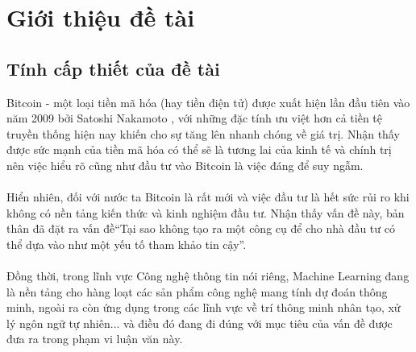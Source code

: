 \chapter{Giới thiệu đề tài}
\section{Tính cấp thiết của đề tài}
Bitcoin - một loại tiền mã hóa (hay tiền điện tử) được xuất hiện lần đầu tiên 
vào năm 2009 bởi Satoshi Nakamoto \cite{Bitcoin}, với những đặc tính ưu việt hơn cả tiền tệ 
truyền thống hiện nay khiến cho sự tăng lên nhanh chóng về giá trị. Nhận thấy 
được sức mạnh của tiền mã hóa có thể sẽ là tương lai của kinh tế và chính trị 
nên việc hiểu rõ cũng như đầu tư vào Bitcoin là việc đáng để suy ngẫm.\\\\
Hiển nhiên, đối với nước ta Bitcoin là rất mới và việc đầu tư là hết sức rủi ro
khi không có nền tảng kiến thức và kinh nghiệm đầu tư. Nhận thấy vấn đề này, 
bản thân đã đặt ra vấn đề``Tại sao không tạo ra một công cụ để cho nhà đầu tư 
có thể dựa vào như một yếu tố tham khảo tin cậy''.\\\\
Đồng thời, trong lĩnh vực Công nghệ thông tin nói riêng, Machine Learning đang là 
nền tảng cho hàng loạt các sản phẩm công nghệ mang tính dự đoán thông minh, ngoài 
ra còn ứng dụng trong các lĩnh vực về trí thông minh nhân tạo, xử lý ngôn ngữ 
tự nhiên... và điều đó đang đi đúng với mục tiêu của vấn đề được đưa ra trong phạm 
vi luận văn này.

